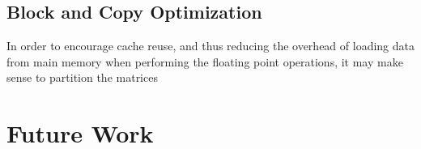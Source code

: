 \documentclass[paper=a4, fontsize=11pt]{scrartcl}
\numberwithin{equation}{section}        %
\numberwithin{figure}{section}          %
\numberwithin{table}{section}               %
\begin{document}
\subsection{Block and Copy Optimization}
In order to encourage cache reuse, and thus reducing the overhead of loading 
data from main memory when performing the floating point operations, it may make
sense to partition the matrices 

\section{Future Work}



\end{document}
